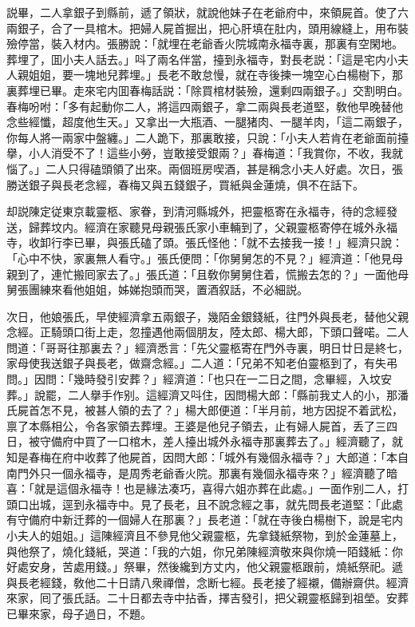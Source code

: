 説畢，二人拿銀子到縣前，遞了領狀，就說他妹子在老爺府中，來領屍首。使了六兩銀子，合了一具棺木。把婦人屍首掘出，把心肝填在肚内，頭用線縫上，用布裝殮停當，裝入材内。張勝說：「就埋在老爺香火院城南永福寺裏，那裏有空閑地。葬埋了，囬小夫人話去。」呌了兩名伴當，擡到永福寺，對長老説：「這是宅内小夫人親姐姐，要一塊地兒葬埋。」長老不敢怠慢，就在寺後揀一塊空心白楊樹下，那裏葬埋已畢。走來宅内囬春梅話説：「除買棺材裝殮，還剩四兩銀子。」交割明白。春梅吩咐：「多有起動你二人，將這四兩銀子，拿二兩與長老道堅，敎他早晚替他念些經懺，超度他生天。」又拿出一大瓶酒、一腿猪肉、一腿羊肉，「這二兩銀子，你每人將一兩家中盤纏。」二人跪下，那裏敢接，只說：「小夫人若肯在老爺面前擡擧，小人消受不了！這些小勞，豈敢接受銀兩？」春梅道：「我賞你，不收，我就惱了。」二人只得磕頭領了出來。兩個班房喫酒，甚是稱念小夫人好處。次日，張勝送銀子與長老念經，春梅又與五錢銀子，買紙與金蓮燒，俱不在話下。

却説陳定従東京載靈柩、家眷，到清河縣城外，把靈柩寄在永福寺，待的念經發送，歸葬坟内。經濟在家聽見母親張氏家小車輛到了，父親靈柩寄停在城外永福寺，收卸行李已畢，與張氏磕了頭。張氏怪他：「就不去接我一接！」經濟只說：「心中不快，家裏無人看守。」張氏便問：「你舅舅怎的不見？」經濟道：「他見母親到了，連忙搬囘家去了。」張氏道：「且敎你舅舅住着，慌搬去怎的？」一面他母舅張團練來看他姐姐，姊娣抱頭而哭，置酒叙話，不必細説。

次日，他娘張氏，早使經濟拿五兩銀子，幾陌金銀錢紙，往門外與長老，替他父親念經。正騎頭口街上走，忽撞遇他兩個朋友，陸太郎、楊大郎，下頭口聲喏。二人問道：「哥哥往那裏去？」經濟悉言：「先父靈柩寄在門外寺裏，明日廿日是終七，家母使我送銀子與長老，做齋念經。」二人道：「兄弟不知老伯靈柩到了，有失弔問。」因問：「幾時發引安葬？」經濟道：「也只在一二日之間，念畢經，入坟安葬。」說罷，二人擧手作别。這經濟又呌住，因問楊大郎：「縣前我丈人的小，那潘氏屍首怎不見，被甚人領的去了？」楊大郎便道：「半月前，地方因捉不着武松，禀了本縣相公，令各家領去葬埋。王婆是他兒子領去，止有婦人屍首，丢了三四日，被守備府中買了一口棺木，差人擡出城外永福寺那裏葬去了。」經濟聽了，就知是春梅在府中收葬了他屍首，因問大郎：「城外有幾個永福寺？」大郎道：「本自南門外只一個永福寺，是周秀老爺香火院。那裏有幾個永福寺來？」經濟聽了暗喜：「就是這個永福寺！也是緣法凑巧，喜得六姐亦葬在此處。」一面作别二人，打頭口出城，逕到永福寺中。見了長老，且不說念經之事，就先問長老道堅：「此處有守備府中新迁葬的一個婦人在那裏？」長老道：「就在寺後白楊樹下，說是宅内小夫人的姐姐。」這陳經濟且不參見他父親靈柩，先拿錢紙祭物，到於金蓮墓上，與他祭了，燒化錢紙，哭道：「我的六姐，你兄弟陳經濟敬來與你燒一陌錢紙：你好處安身，苦處用錢。」祭畢，然後纔到方丈内，他父親靈柩跟前，燒紙祭祀。遞與長老經錢，敎他二十日請八衆禪僧，念断七經。長老接了經襯，備辦齋供。經濟來家，囘了張氏話。二十日都去寺中拈香，擇吉發引，把父親靈柩歸到祖塋。安葬已畢來家，母子過日，不題。

